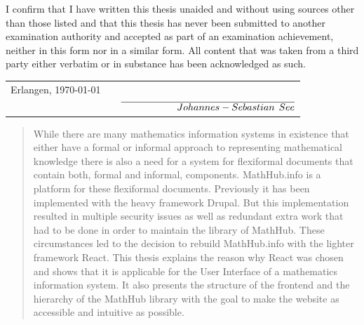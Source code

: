\documentclass[11pt,a4paper]{article}
\begin{document}
\thispagestyle{empty}
I confirm that I have written this thesis unaided and without using sources other than those listed and that this thesis has never been submitted to another examination authority and accepted as part of an examination achievement, neither in this form nor in a similar form. 
All content that was taken from a third party either verbatim or in substance has been acknowledged as such. \par
\vspace{1.5cm}
\hspace{-0.34cm} \begin{tabularx}{14.2cm}{l X r}
Erlangen, \today & & \\
& & $\overline{\hspace{2cm} Johannes-Sebastian \hspace{1ex} See}$ \\
\end{tabularx}
\newpage
\begin{abstract}
\noindent While there are many mathematics information systems in existence that either have a formal or informal approach to representing mathematical knowledge there is also a need for a system for flexiformal documents that contain both, formal and informal, components.
MathHub.info is a platform for these flexiformal documents.
Previously it has been implemented with the heavy framework Drupal.
But this implementation resulted in multiple security issues as well as redundant extra work that had to be done in order to maintain the library of MathHub.
These circumstances led to the decision to rebuild MathHub.info with the lighter framework React.
\newline \newline
This thesis explains the reason why React was chosen and shows that it is applicable for the User Interface of a mathematics information system.
It also presents the structure of the frontend and the hierarchy of the MathHub library with the goal to make the website as accessible and intuitive as possible.
  
\end{abstract}
\newpage  
\thispagestyle{empty}
\tableofcontents
\pagebreak
{}
\end{document}
